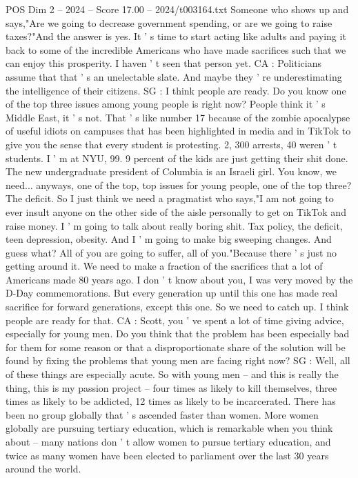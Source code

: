 \begin{textsample}{POS Dim 2 – 2024 – Score 17.00 – 2024/t003164.txt}
Someone who shows up and says,"Are we going to decrease government spending, or are we going to raise taxes?"And the answer is yes.
It ' s time to start acting like adults and paying it back to some of the incredible Americans who have made sacrifices such that we can enjoy this prosperity.
I haven ' t seen that person yet.
CA : Politicians assume that that ' s an unelectable slate.
And maybe they ' re underestimating the intelligence of their citizens.
SG : I think people are ready.
Do you know one of the top three issues among young people is right now?
People think it ' s Middle East, it ' s not.
That ' s like number 17 because of the zombie apocalypse of useful idiots on campuses that has been highlighted in media and in TikTok to give you the sense that every student is protesting. 2, 300 arrests, 40 weren ' t students.
I ' m at NYU, 99. 9 percent of the kids are just getting their shit done.
The new undergraduate president of Columbia is an Israeli girl.
You know, we need... anyways, one of the top, top issues for young people, one of the top three?
The deficit.
So I just think we need a pragmatist who says,"I am not going to ever insult anyone on the other side of the aisle personally to get on TikTok and raise money.
I ' m going to talk about really boring shit.
Tax policy, the deficit, teen depression, obesity.
And I ' m going to make big sweeping changes.
And guess what?
All of you are going to suffer, all of you."Because there ' s just no getting around it.
We need to make a fraction of the sacrifices that a lot of Americans made 80 years ago.
I don ' t know about you, I was very moved by the D-Day commemorations.
But every generation up until this one has made real sacrifice for forward generations, except this one.
So we need to catch up.
I think people are ready for that.
CA : Scott, you ' ve spent a lot of time giving advice, especially for young men.
Do you think that the problem has been especially bad for them for some reason or that a disproportionate share of the solution will be found by fixing the problems that young men are facing right now?
SG : Well, all of these things are especially acute.
So with young men -- and this is really the thing, this is my passion project -- four times as likely to kill themselves, three times as likely to be addicted, 12 times as likely to be incarcerated.
There has been no group globally that ' s ascended faster than women.
More women globally are pursuing tertiary education, which is remarkable when you think about -- many nations don ' t allow women to pursue tertiary education, and twice as many women have been elected to parliament over the last 30 years around the world.

\end{textsample}
